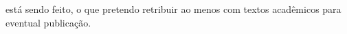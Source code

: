\documentclass[a4paper, 11pt]{article} %
\begin{document}
está sendo feito, o que pretendo retribuir ao menos com textos acadêmicos para eventual publicação.

%



\end{document}
